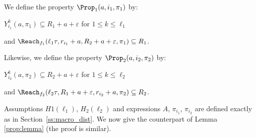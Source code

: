 We define the property
%
$\Prop_1(a,i_1,\pi_{1})$ by:
\begin{center}
  $Y^{k}_{i_1}(a,\pi_{1})\subseteq R_1+a+\varepsilon$ for $1\leq k\leq \ell_{1}$\par
  and
  $\Reach_{f_1}(\ell_1\tau,r_{i_1}+a,R_2+a+\varepsilon,\pi_{1})\subseteq R_1$.
\end{center}
%
Likewise, we define the property
%
$\Prop_2(a,i_2,\pi_{2})$ by:
\begin{center}
  $Y^{k}_{i_2}(a,\pi_{2})\subseteq R_2+a+\varepsilon$ for $1\leq k\leq \ell_{2}$\par
  and
  $\Reach_{f_2}(\ell_2\tau,R_1+a+\varepsilon,r_{i_2}+a,\pi_{2})\subseteq R_2$.
\end{center}

Assumptions $H1(\ell_1)$, $H_2(\ell_2)$ and expressions 
$A$, 
$\pi_{i_1}$, $\pi_{i_2}$
are defined exactly
as in Section~\ref{ss:macro_dist}.
%
We now give the counterpart of Lemma \ref{prop:lemma} 
(the proof is similar).

